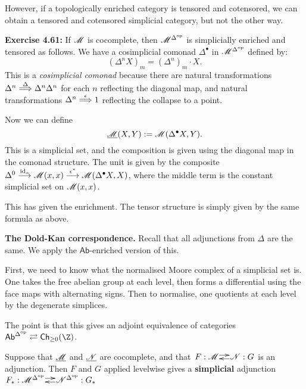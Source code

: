 \documentclass[11pt]{article}
\begin{document}
\begin{4. Basic concepts in enriched category theory}
\begin{itemise}
However, if a topologically enriched category is tensored and cotensored, we can obtain a tensored and cotensored simplicial category, but not the other way.
\item \textbf{Exercise 4.61:} If $\mathscr{M}$ is cocomplete, then $\mathscr{M}^{\Delta^{\textup{op}}}$ is simplicially enriched and tensored as follows. We have a cosimplicial comonad $\Delta^\bullet$ in $\mathscr{M}^{\Delta^{\textup{op}}}$ defined by:
\[(\Delta^nX)_m=(\Delta^n)_m\cdot X.\]
This is a \emph{cosimplicial comonad} because there are natural transformations $\Delta^n\overset{\Delta}{\Longrightarrow} \Delta^n\Delta^n$ for each $n$ reflecting the diagonal map, and natural transformations $\Delta^n\overset{\epsilon}{\Longrightarrow} 1$ reflecting the collapse to a point.

Now we can define
\[\underline{\mathscr{M}}(X,Y ):=\mathscr{M}(\Delta^\bullet X,Y).\]
This is a simplicial set, and the composition is given using the diagonal map in the comonad structure. The unit is given by the composite $\Delta^0\overset{\textup{id}_x}{\longrightarrow}\mathscr{M}(x,x)\overset{\epsilon^*}{\longrightarrow}\mathscr{M}(\Delta^\bullet X,X)$, where the middle term is the constant simplicial set on $\mathscr{M}(x,x)$.

This has given the enrichment. The tensor structure is simply given by the same formula as above.
\item \textbf{The Dold-Kan correspondence.} 
Recall that all adjunctions from $\Delta$ are the same. We apply the $\mathsf{Ab}$-enriched version of this.

First, we need to know what the normalised Moore complex of a simplicial set is. One takes the free abelian group at each level, then forms a differential using the face maps with alternating signs. Then to normalise, one quotients at each level by the degenerate simplices. 

The point is that this gives an adjoint equivalence of categories $\mathsf{Ab}^{\Delta^{\op}}\rightleftarrows \mathsf{Ch}_{\geq0}(\Z)$. 
\item Suppose that $\underline{\mathscr{M}}$ and $\underline{\mathscr{N}}$ are cocomplete, and that 
$\xymatrix@C=.41cm@1{
F:\scrM  \ar@<.6ex>[r]&
\scrN:G  \ar@<.4ex>[l]
}$
 is an adjunction. Then $F$ and $G$ applied levelwise gives a \textbf{simplicial} adjunction $\xymatrix@C=.41cm@1{
F_*:\scrM^{\Delta^{\op}}  \ar@<.6ex>[r]&
\scrN^{\Delta^{\op}}:G_*  \ar@<.4ex>[l]
}$
\end{itemise}

\end{4. Basic concepts in enriched category theory}
\end{document}

